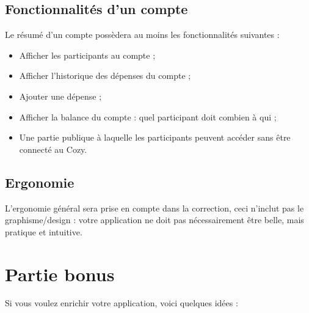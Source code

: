 \documentclass{42-fr}
\begin{document}
    \section{Fonctionnalit\'es d'un compte}

        Le r\'esum\'e d'un compte poss\`edera au moins les fonctionnalit\'es suivantes :\\

        \begin{itemize}\itemsep1pt
            \item Afficher les participants au compte ;
            \item Afficher l'historique des d\'epenses du compte ;
			\item Ajouter une d\'epense ;
			\item Afficher la balance du compte : quel participant doit combien \`a qui ;
	        \item Une partie publique \`a laquelle les participants peuvent acc\'eder sans
				\^etre connect\'e au Cozy.
        \end{itemize}


    \section{Ergonomie}

        L'ergonomie g\'en\'eral sera prise en compte dans la correction,
		ceci n'inclut pas le graphisme/design : votre application ne doit
		pas n\'ecessairement \^etre belle, mais pratique et intuitive.




\chapter{Partie bonus}

    Si vous voulez enrichir votre application, voici quelques id\'ees :\newline
\end{document}
